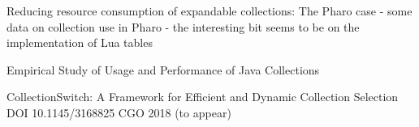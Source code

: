 \documentclass[sigconf, 10pt]{acmart}
\begin{document}
\begin{note}
Reducing resource consumption of expandable collections: The Pharo case
- some data on collection use in Pharo
- the interesting bit seems to be on the implementation of Lua tables

\citep{Bergel:2018}

Empirical Study of Usage and Performance of Java Collections \citep{Costa:2017:ESU}


CollectionSwitch: A Framework for Efficient and Dynamic Collection Selection
DOI 10.1145/3168825
CGO 2018 (to appear)








\end{note} 






\end{document}
